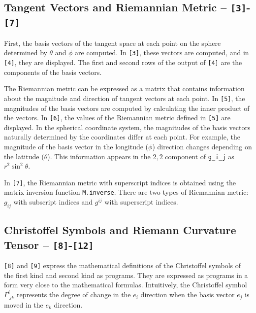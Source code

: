 \subsection{Tangent Vectors and Riemannian Metric -- \texttt{[3]}-\texttt{[7]}}

First, the basis vectors of the tangent space at each point on the sphere determined by $\theta$ and $\phi$ are computed.
In \texttt{[3]}, these vectors are computed, and in \texttt{[4]}, they are displayed.
The first and second rows of the output of \texttt{[4]} are the components of the basis vectors.

The Riemannian metric can be expressed as a matrix that contains information about the magnitude and direction of tangent vectors at each point.
In \texttt{[5]}, the magnitudes of the basis vectors are computed by calculating the inner product of the vectors.
In \texttt{[6]}, the values of the Riemannian metric defined in \texttt{[5]} are displayed.
In the spherical coordinate system, the magnitudes of the basis vectors naturally determined by the coordinates differ at each point.
For example, the magnitude of the basis vector in the longitude ($\phi$) direction changes depending on the latitude ($\theta$).
This information appears in the $2,2$ component of \lstinline|g_i_j| as $r^2 \sin^2 \theta$.

In \texttt{[7]}, the Riemannian metric with superscript indices is obtained using the matrix inversion function \lstinline{M.inverse}.
There are two types of Riemannian metric: $g_{ij}$ with subscript indices and $g^{ij}$ with superscript indices.

\subsection{Christoffel Symbols and Riemann Curvature Tensor -- \texttt{[8]}-\texttt{[12]}}



\texttt{[8]} and \texttt{[9]} express the mathematical definitions of the Christoffel symbols of the first kind and second kind as programs.
They are expressed as programs in a form very close to the mathematical formulas.
Intuitively, the Christoffel symbol $\Gamma^{i}_{\;jk}$ represents the degree of change in the $e_i$ direction when the basis vector $e_j$ is moved in the $e_k$ direction.

